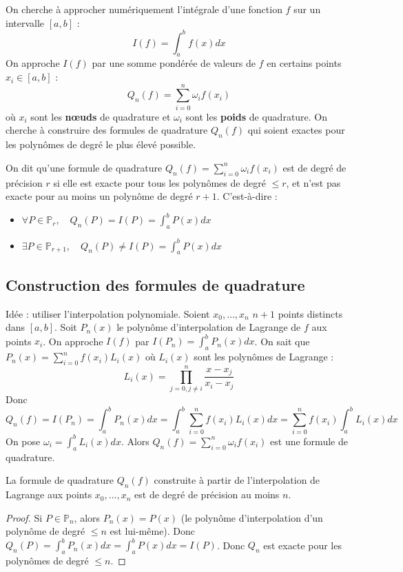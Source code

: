 \documentclass[oneside]{book}
\begin{document}
On cherche à approcher numériquement l'intégrale d'une fonction $f$ sur un intervalle $[a, b]$ :
\[
I(f) = \int_{a}^{b} f(x) dx
\]
On approche $I(f)$ par une somme pondérée de valeurs de $f$ en certains points $x_i \in [a, b]$ :
\[
Q_n(f) = \sum_{i=0}^{n} \omega_i f(x_i)
\]
où $x_i$ sont les \textbf{nœuds} de quadrature et $\omega_i$ sont les \textbf{poids} de quadrature.
On cherche à construire des formules de quadrature $Q_n(f)$ qui soient exactes pour les polynômes de degré le plus élevé possible.

\begin{definition}
On dit qu'une formule de quadrature $Q_n(f) = \sum_{i=0}^{n} \omega_i f(x_i)$ est de degré de précision $r$ si elle est exacte pour tous les polynômes de degré $\leq r$, et n'est pas exacte pour au moins un polynôme de degré $r+1$.
C'est-à-dire :
\begin{itemize}
    \item $\forall P \in \mathbb{P}_r, \quad Q_n(P) = I(P) = \int_{a}^{b} P(x) dx$
    \item $\exists P \in \mathbb{P}_{r+1}, \quad Q_n(P) \neq I(P) = \int_{a}^{b} P(x) dx$
\end{itemize}
\end{definition}

\subsection{Construction des formules de quadrature}

Idée : utiliser l'interpolation polynomiale.
Soient $x_0, \dots, x_n$ $n+1$ points distincts dans $[a, b]$.
Soit $P_n(x)$ le polynôme d'interpolation de Lagrange de $f$ aux points $x_i$.
On approche $I(f)$ par $I(P_n) = \int_{a}^{b} P_n(x) dx$.
On sait que $P_n(x) = \sum_{i=0}^{n} f(x_i) L_i(x)$ où $L_i(x)$ sont les polynômes de Lagrange :
\[
L_i(x) = \prod_{j=0, j\neq i}^{n} \frac{x - x_j}{x_i - x_j}
\]
Donc
\[
Q_n(f) = I(P_n) = \int_{a}^{b} P_n(x) dx = \int_{a}^{b} \sum_{i=0}^{n} f(x_i) L_i(x) dx = \sum_{i=0}^{n} f(x_i) \int_{a}^{b} L_i(x) dx
\]
On pose $\omega_i = \int_{a}^{b} L_i(x) dx$.
Alors $Q_n(f) = \sum_{i=0}^{n} \omega_i f(x_i)$ est une formule de quadrature.

\begin{proposition}
La formule de quadrature $Q_n(f)$ construite à partir de l'interpolation de Lagrange aux points $x_0, \dots, x_n$ est de degré de précision au moins $n$.
\end{proposition}
\begin{proof}
Si $P \in \mathbb{P}_n$, alors $P_n(x) = P(x)$ (le polynôme d'interpolation d'un polynôme de degré $\leq n$ est lui-même).
Donc $Q_n(P) = \int_{a}^{b} P_n(x) dx = \int_{a}^{b} P(x) dx = I(P)$.
Donc $Q_n$ est exacte pour les polynômes de degré $\leq n$.
\end{proof}
\end{document}
